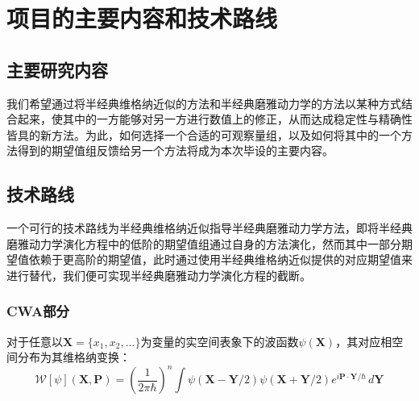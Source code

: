 \section{项目的主要内容和技术路线}

\subsection{主要研究内容}
我们希望通过将半经典维格纳近似的方法和半经典磨雅动力学的方法以某种方式结合起来，使其中的一方能够对另一方进行数值上的修正，从而达成稳定性与精确性皆具的新方法。为此，如何选择一个合适的可观察量组，以及如何将其中的一个方法得到的期望值组反馈给另一个方法将成为本次毕设的主要内容。

\subsection{技术路线}
一个可行的技术路线为半经典维格纳近似指导半经典磨雅动力学方法，即将半经典磨雅动力学演化方程中的低阶的期望值组通过自身的方法演化，然而其中一部分期望值依赖于更高阶的期望值，此时通过使用半经典维格纳近似提供的对应期望值来进行替代，我们便可实现半经典磨雅动力学演化方程的截断。
\subsubsection{CWA部分}
对于任意以$\boldsymbol{X} = \{x_1, x_2, ...\}$为变量的实空间表象下的波函数$\psi(\boldsymbol{X})$，其对应相空间分布为其维格纳变换：
\begin{equation}
\mathcal{W} \left[ \psi \right] (\boldsymbol{X}, \boldsymbol{P}) = \left(\frac{1}{2\pi \hbar}\right)^n \int \psi(\boldsymbol{X}-\boldsymbol{Y}/2) \psi(\boldsymbol{X} + \boldsymbol{Y}/2) e^{i \boldsymbol{P} \cdot \boldsymbol{Y} / \hbar} \, d\boldsymbol{Y} 
\end{equation}


